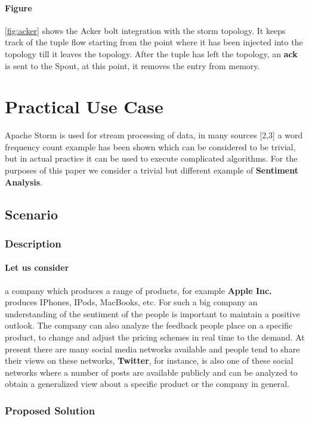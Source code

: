 \documentclass[runningheads,a4paper]{llncs}[2015/06/24]
\begin{document}
\paragraph{Figure} \ref{fig:acker} shows the Acker bolt integration with the storm topology. It keeps track of the tuple flow starting from the point where it has been injected into the topology till it leaves the topology. After the tuple has left the topology, an \textbf{ack} is sent to the Spout, at this point, it removes the entry from memory.

\section{Practical Use Case}
\label{sec:usecase}
Apache Storm is used for stream processing of data, in many sources [2,3] a word frequency count example has been shown which can be considered to be trivial, but in actual practice it can be used to execute complicated algorithms. For the purposes of this paper we consider a trivial but different example of \textbf{Sentiment Analysis}.

\subsection{Scenario}

\subsubsection{Description}
\paragraph{Let us consider} a company which produces a range of products, for example \textbf{Apple Inc.} produces IPhones, IPods, MacBooks, etc. For such a big company an understanding of the sentiment of the people is important to maintain a positive outlook. The company can also analyze the feedback people place on a specific product, to change and adjust the pricing schemes in real time to the demand.  At present there are many social media networks available and people tend to share their views on these networks,  \textbf{Twitter}, for instance, is also one of these social networks where a number of posts are available publicly and can be analyzed to obtain a generalized view about a specific product or the company in general.

\subsubsection{Proposed Solution}
\end{document}
